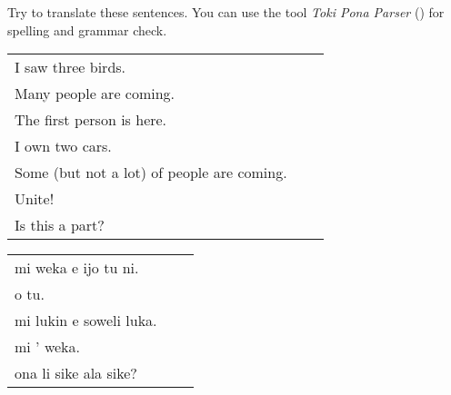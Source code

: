 Try to translate these sentences. 
You can use the tool \textit{Toki Pona Parser} (\cite{www:rowa:02}) for spelling and grammar check. 

\begin{supertabular}{p{5,5cm}|ll}
I saw three birds.  &&   \\ %
Many people are coming. &&  \\   %
The first person is here. && \\   %
I own two cars.  &&  \\ %
Some (but not a lot) of people are coming. && \\  %
Unite!  &&   \\ %
Is this a part? &&  \\ %
\end{supertabular}

\begin{supertabular}{p{5,5cm}|ll}
mi weka e ijo tu ni. &&   \\ %
o tu.  &&  \\ %
mi lukin e soweli luka. && \\   %
mi ' weka.  &&  \\ %
ona li sike ala sike? && \\ %
\end{supertabular}
